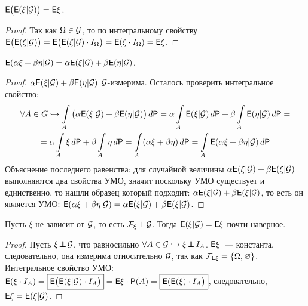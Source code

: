 \begin{property}
	 $\mathsf{E} \big( \mathsf{E}( \xi | \mathcal{G}) \big) = \mathsf{E}\xi$.
	 \begin{proof}
	 	Так как $\Omega \in \mathcal{G}$, то по интегральному свойству $\mathsf{E} \big( \mathsf{E}(\xi | \mathcal{G}) \big) = \mathsf{E} \big( \mathsf{E}(\xi | \mathcal{G} ) \cdot I_\Omega \big) = \mathsf{E}( \xi \cdot I_\Omega) = \mathsf{E}\xi$.
	 \end{proof}
\end{property}

\begin{property}[линейность]
	$\mathsf{E} (\alpha \xi + \beta \eta | \mathcal{G} ) = \alpha \mathsf{E}( \xi | \mathcal{G}) + \beta \mathsf{E}(\eta |\mathcal{G})$.
	\begin{proof}
		$\alpha \mathsf{E}(\xi | \mathcal{G}) + \beta \mathsf{E}(\eta | \mathcal{G})$ $\mathcal{G}$-измерима. Осталось проверить интегральное свойство:
		\begin{multline*}
			\forall A \in G \hookrightarrow \int\limits_A \big( \alpha \mathsf{E}( \xi | \mathcal{G}) + \beta \mathsf{E}( \eta | \mathcal{G}) \big) \, d \mathsf{P} = \alpha \int\limits_A \mathsf{E}( \xi | \mathcal{G}) \, d \mathsf{P} + \beta \int\limits_A \mathsf{E}( \eta | \mathcal{G} ) \, d \mathsf{P} = \\ 
			= \alpha \int\limits_A \xi \, d \mathsf{P} + \beta \int\limits_A \eta \, d \mathsf{P} = \int\limits_A (\alpha \xi + \beta \eta ) \, d\mathsf{P} = \int\limits_A \mathsf{E}( \alpha\xi + \beta\eta|\mathcal{G}) \, d \mathsf{P}
		\end{multline*}
		Объяснение последнего равенства: для случайной величины $\alpha\mathsf{E}(\xi|\mathcal{G}) + \beta\mathsf{E}(\xi|\mathcal{G})$ выполняются два свойства УМО, значит поскольку УМО существует и единственно, то нашли образец который подходит: $\alpha\mathsf{E}(\xi|\mathcal{G}) + \beta\mathsf{E}(\xi|\mathcal{G})$, то есть он является УМО: $\mathsf{E}(\alpha\xi + \beta\eta|\mathcal{G}) = \alpha\mathsf{E}(\xi|\mathcal{G}) + \beta\mathsf{E}(\xi|\mathcal{G})$.
	\end{proof}
\end{property}

\begin{property}
	Пусть $\xi$ не зависит от $\mathcal{G}$, то есть $\mathcal{F}_\xi \!\perp\!\!\!\!\perp\! \mathcal{G}$. Тогда $\mathsf{E} ( \xi | \mathcal{G}) = \mathsf{E} \xi$ почти наверное.
	\begin{proof}
		Пусть $\xi \!\perp\!\!\!\!\perp\! \mathcal{G}$, что равносильно $\forall A \in \mathcal{G} \hookrightarrow \xi \!\perp\!\!\!\!\perp\! I_A$. $\mathsf{E} \xi$~--- константа, следовательно, она измерима относительно $\mathcal{G}$, так как $\mathcal{F}_{\mathsf{E} \xi} = \{ \Omega, \varnothing \}$. Интегральное свойство УМО: $\mathsf{E} ( \xi \cdot I_A) = \boxed{\mathsf{E} \big( \mathsf{E}( \xi | \mathcal{G}) \cdot I_A \big)} = \mathsf{E} \xi \cdot \mathsf{P}(A) = \boxed{\mathsf{E}(\mathsf{E}(\xi) \cdot I_A \big)}$, следовательно, $\mathsf{E} \xi = \mathsf{E}( \xi | \mathcal{G})$.
	\end{proof}
\end{property}

